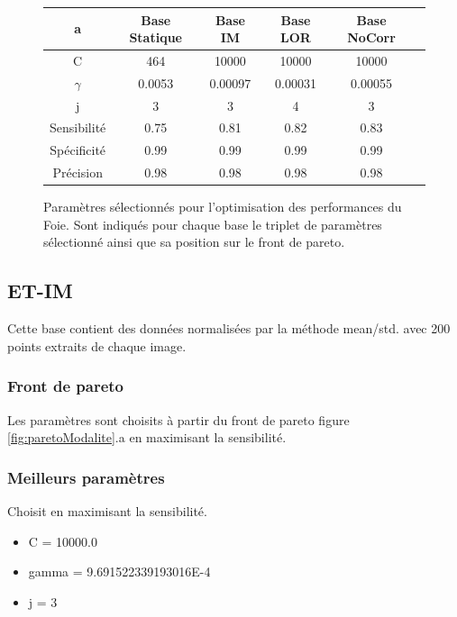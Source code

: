 \begin{figure}[h!]
\label{fig:paramsModPoumon}
		\begin{tabular}{c c c c c c}
  \hline
  a	& Base Statique	& Base IM	& Base LOR	& Base NoCorr	\\
  \hline
 C 	& 464		& 10000		& 10000		& 10000		\\
\hline
$\gamma$& 0.0053	& 0.00097	& 0.00031	& 0.00055	\\
\hline
j	& 3		& 3		& 4		& 3		\\
\hline
\hline
Sensibilité& 0.75	& 0.81		& 0.82		& 0.83	\\
\hline
Spécificité& 0.99	& 0.99		& 0.99		& 0.99		\\
\hline
Précision& 0.98		& 0.98		& 0.98		& 0.98		\\
\hline
 		\end{tabular}

\caption{Paramètres sélectionnés pour l'optimisation des performances du Foie. Sont indiqués pour chaque base le triplet de paramètres sélectionné ainsi que sa position sur le front de pareto.}
\end{figure}



\subsection{ET-IM}

Cette base contient des données normalisées par la méthode mean/std. avec 200 points extraits de chaque image.

\subsubsection{Front de pareto}

Les paramètres sont choisits à partir du front de pareto figure \ref{fig:paretoModalite}.a en maximisant la sensibilité.

\subsubsection{Meilleurs paramètres}

Choisit en maximisant la sensibilité.			

\begin{itemize}
\item C = 10000.0
\item gamma = 9.691522339193016E-4
\item j = 3
\end{itemize}

